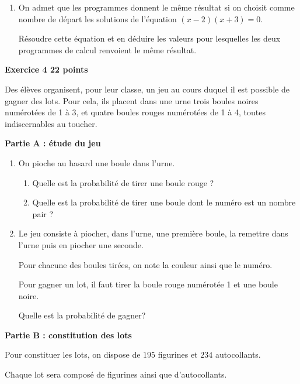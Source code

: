 \documentclass[11pt]{article}
\begin{document}
\begin{enumerate}
\begin{enumerate}
$x^2 + 3x - 16$.
		\item On admet que les programmes donnent le même résultat si on choisit comme nombre de départ les solutions de l'équation $(x - 2)(x + 3) = 0$.
		
Résoudre cette équation et en déduire les valeurs pour lesquelles les deux programmes de calcul
renvoient le même résultat.
	\end{enumerate}
\end{enumerate}

\bigskip

\textbf{Exercice 4 \hfill 22 points}

\medskip

Des élèves organisent, pour leur classe, un jeu au cours duquel il est possible de gagner des lots. Pour cela, ils placent dans une urne trois boules noires numérotées de 1 à 3, et quatre boules rouges numérotées de 1 à 4, toutes indiscernables au toucher.

\bigskip

\textbf{Partie A : étude du jeu}

\medskip

\begin{enumerate}
\item On pioche au hasard une boule dans l'urne.
	\begin{enumerate}
		\item Quelle est la probabilité de tirer une boule rouge ?
		\item Quelle est la probabilité de tirer une boule dont le numéro est un nombre pair ?
	\end{enumerate}
\item Le jeu consiste à piocher, dans l'urne, une première boule, la remettre dans l'urne puis en piocher une seconde.

Pour chacune des boules tirées, on note la couleur ainsi que le numéro.

Pour gagner un lot, il faut tirer la boule rouge numérotée 1 et une boule noire.

Quelle est la probabilité de gagner?
\end{enumerate}

\bigskip

\textbf{Partie B : constitution des lots}

\medskip

Pour constituer les lots, on dispose de $195$ figurines et $234$ autocollants.

Chaque lot sera composé de figurines ainsi que d'autocollants.
\end{document}
